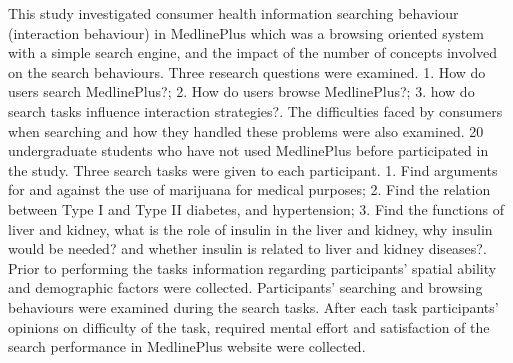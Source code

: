 \documentclass[]{article}
\begin{document}
This study investigated consumer health information searching behaviour (interaction behaviour) in MedlinePlus which was a browsing oriented system with a simple search engine, and the impact of the number of concepts involved on the search behaviours. Three research  questions were examined. 1. How do users search MedlinePlus?; 2. How do users browse MedlinePlus?; 3. how do search tasks influence interaction strategies?. The difficulties faced by consumers when searching and how they handled these problems were also examined. 20 undergraduate students who have not used MedlinePlus before participated in the study. Three search tasks were given to each participant. 1. Find arguments for and against the use of marijuana for medical purposes; 2. Find the relation between Type I and Type II diabetes, and hypertension; 3. Find the functions of liver and kidney, what is the role of insulin in the liver and kidney, why insulin would be needed? and whether insulin is related to liver and kidney diseases?. Prior to performing the tasks information regarding participants' spatial ability and demographic factors were collected. Participants' searching and browsing behaviours were examined during the search tasks. After each task participants' opinions on difficulty of the task, required mental effort and satisfaction of the search performance in MedlinePlus website were collected.                
\end{document}
